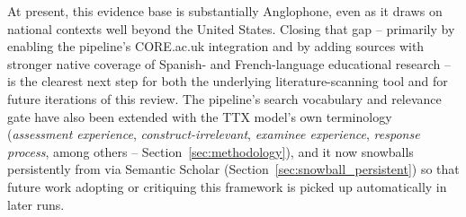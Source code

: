\documentclass[11pt]{article}
\begin{document}
At present, this evidence base is substantially Anglophone, even as it draws on national contexts well beyond the United States. Closing that gap -- primarily by enabling the pipeline's CORE.ac.uk integration and by adding sources with stronger native coverage of Spanish- and French-language educational research -- is the clearest next step for both the underlying literature-scanning tool and for future iterations of this review. The pipeline's search vocabulary and relevance gate have also been extended with the TTX model's own terminology (\textit{assessment experience}, \textit{construct-irrelevant}, \textit{examinee experience}, \textit{response process}, among others -- Section~\ref{sec:methodology}), and it now snowballs persistently from \citet{araneda2023dissertation} via Semantic Scholar (Section~\ref{sec:snowball_persistent}) so that future work adopting or critiquing this framework is picked up automatically in later runs.
\end{document}
